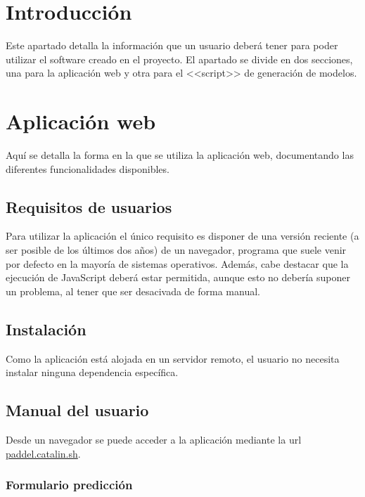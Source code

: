\label{cha:Documentación de usuario}

\section{Introducción}

Este apartado detalla la información que un usuario deberá tener para poder
utilizar el software creado en el proyecto. El apartado se divide en dos
secciones, una para la aplicación web y otra para el <<script>> de generación de
modelos.

\section{Aplicación web}

Aquí se detalla la forma en la que se utiliza la aplicación web, documentando
las diferentes funcionalidades disponibles.

\subsection{Requisitos de usuarios}

Para utilizar la aplicación el único requisito es disponer de una versión
reciente (a ser posible de los últimos dos años) de un navegador, programa que
suele venir por defecto en la mayoría de sistemas operativos. Además, cabe
destacar que la ejecución de JavaScript deberá estar permitida, aunque esto no
debería suponer un problema, al tener que ser desacivada de forma manual.

\subsection{Instalación}

Como la aplicación está alojada en un servidor remoto, el usuario no necesita
instalar ninguna dependencia específica.

\subsection{Manual del usuario}

Desde un navegador se puede acceder a la aplicación mediante la url
\href{https://paddle.catalin.sh}{paddel.catalin.sh}.

\subsubsection{Formulario predicción}

